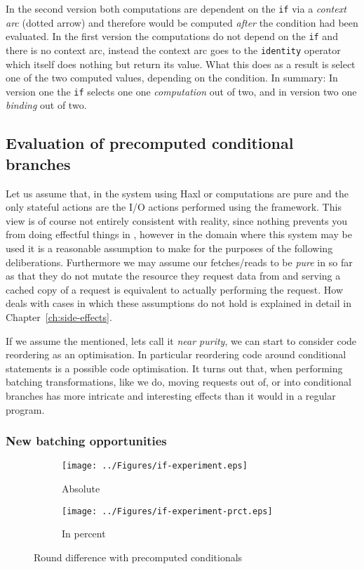 In the second version both computations are dependent on the \texttt{if} via a \textit{context arc} (dotted arrow) and therefore would be computed \textit{after} the condition had been evaluated.
In the first version the computations do not depend on the \texttt{if} and there is no context arc, instead the context arc goes to the \texttt{identity} operator which itself does nothing but return its value.
What this does as a result is select one of the two computed values, depending on the condition.
In summary: In version one the \texttt{if} selects one one \emph{computation} out of two, and in version two one \emph{binding} out of two.


\subsection{Evaluation of precomputed conditional branches}

\label{sec:precomp-eval}

Let us assume that, in the system using Haxl or \yauhau{} computations are pure and the only stateful actions are the I/O actions performed using the framework.
This view is of course not entirely consistent with reality, since nothing prevents you from doing effectful things in \yauhau{}, however in the domain where this system may be used it is a reasonable assumption to make for the purposes of the following deliberations.
Furthermore we may assume our fetches/reads to be \textit{pure} in so far as that they do not mutate the resource they request data from and serving a cached copy of a request is equivalent to actually performing the request.
How \yauhau{} deals with cases in which these assumptions do not hold is explained in detail in Chapter~\ref{ch:side-effects}.

If we assume the mentioned, lets call it \textit{near purity}, we can start to consider code reordering as an optimisation.
In particular reordering code around conditional statements is a possible code optimisation.
It turns out that, when performing batching transformations, like we do, moving requests out of, or into conditional branches has more intricate and interesting effects than it would in a regular program.

\subsubsection{New batching opportunities}

\begin{figure}[h]
  \begin{subfigure}{\textwidth}
      \texttt{[image: ../Figures/if-experiment.eps]}
      \caption{Absolute}
      \label{fig:if-experiment}
  \end{subfigure}
  \begin{subfigure}{\textwidth}
    \texttt{[image: ../Figures/if-experiment-prct.eps]}
    \caption{In percent}
    \label{fig:if-experiment-prct}
  \end{subfigure}
  \caption{Round difference with precomputed conditionals}
\end{figure}

